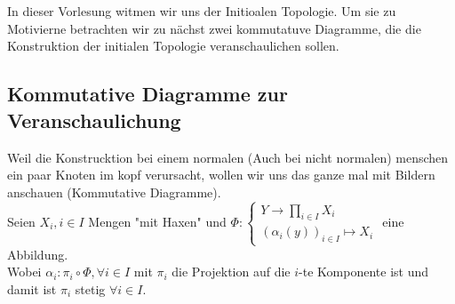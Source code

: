 \chapter{}
In dieser Vorlesung witmen wir uns der Initioalen Topologie. 
Um sie zu Motivierne betrachten wir zu nächst 
zwei kommutatuve Diagramme, die die Konstruktion der initialen 
Topologie veranschaulichen sollen.

\section{Kommutative Diagramme zur Veranschaulichung}

Weil die Konstrucktion bei einem normalen (Auch bei nicht normalen)
menschen
ein paar Knoten im kopf verursacht, wollen wir uns das ganze mal 
mit Bildern anschauen (Kommutative Diagramme).\\
Seien $X_i, i\in I$ Mengen "mit Haxen" und 
$
\Phi:
\begin{cases} Y\to \prod_{i\in I}X_i\\
    (\alpha_i(y))_{i\in I} \mapsto X_i
\end{cases}
$
eine Abbildung.\\
Wobei $\alpha_{i}: \pi_i \circ \Phi,  \forall i \in I$  mit $\pi_i$
die Projektion auf die $i$-te Komponente ist und damit ist $\pi_i$ stetig     
$\forall i \in I$.\\


